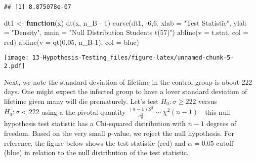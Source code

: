 \documentclass[
]{book}
\newenvironment{Shaded}{\begin{snugshade}}{\end{snugshade}}
\newcommand{\AttributeTok}[1]{\textcolor[rgb]{0.77,0.63,0.00}{#1}}
\newcommand{\ControlFlowTok}[1]{\textcolor[rgb]{0.13,0.29,0.53}{\textbf{#1}}}
\newcommand{\DecValTok}[1]{\textcolor[rgb]{0.00,0.00,0.81}{#1}}
\newcommand{\FloatTok}[1]{\textcolor[rgb]{0.00,0.00,0.81}{#1}}
\newcommand{\FunctionTok}[1]{\textcolor[rgb]{0.00,0.00,0.00}{#1}}
\newcommand{\NormalTok}[1]{#1}
\newcommand{\OtherTok}[1]{\textcolor[rgb]{0.56,0.35,0.01}{#1}}
\newcommand{\SpecialCharTok}[1]{\textcolor[rgb]{0.00,0.00,0.00}{#1}}
\newcommand{\StringTok}[1]{\textcolor[rgb]{0.31,0.60,0.02}{#1}}
\begin{document}
\begin{verbatim}
## [1] 8.875078e-07
\end{verbatim}

\begin{Shaded}
\begin{Highlighting}[]
\NormalTok{dt1 }\OtherTok{\textless{}{-}} \ControlFlowTok{function}\NormalTok{(x) }\FunctionTok{dt}\NormalTok{(x, n\_B }\SpecialCharTok{{-}} \DecValTok{1}\NormalTok{)}
\FunctionTok{curve}\NormalTok{(dt1, }\SpecialCharTok{{-}}\DecValTok{6}\NormalTok{,}\DecValTok{6}\NormalTok{, }\AttributeTok{xlab =} \StringTok{"Test Statistic"}\NormalTok{, }\AttributeTok{ylab =} \StringTok{"Density"}\NormalTok{, }\AttributeTok{main =} \StringTok{"Null Distribution Student\textquotesingle{}s t(57)"}\NormalTok{)}
\FunctionTok{abline}\NormalTok{(}\AttributeTok{v =}\NormalTok{ t.stat, }\AttributeTok{col =} \StringTok{\textquotesingle{}red\textquotesingle{}}\NormalTok{)}
\FunctionTok{abline}\NormalTok{(}\AttributeTok{v =} \FunctionTok{qt}\NormalTok{(}\FloatTok{0.05}\NormalTok{, n\_B}\DecValTok{{-}1}\NormalTok{), }\AttributeTok{col =} \StringTok{\textquotesingle{}blue\textquotesingle{}}\NormalTok{)}
\end{Highlighting}
\end{Shaded}

\texttt{[image: 13-Hypothesis-Testing\_files/figure-latex/unnamed-chunk-5-2.pdf]}

Next, we note the standard deviation of lifetime in the control group is about 222 days. One might expect the infected group to have a lover standard deviation of lifetime given many will die prematurely. Let's test \(H_0: \sigma \geq 222\) versus \(H_0: \sigma < 222\) using a the pivotal quantity \(\frac{(n-1)S^2}{\sigma_0^2} \sim \chi^2(n-1)\)---this null hypothesis test statistic has a Chi-squared distribution with \(n-1\) degrees of freedom. Based on the very small p-value, we reject the null hypothesis. For reference, the figure below shows the test statistic (red) and \(\alpha =0.05\) cutoff (blue) in relation to the null distribution of the test statistic.

\begin{Shaded}
\end{Shaded}
\end{document}
